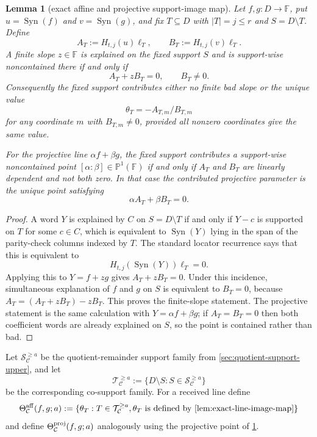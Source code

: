 \documentclass[11pt]{article}
\newtheorem{lemma}[theorem]{Lemma}
\theoremstyle{definition}
\theoremstyle{remark}
\newcommand{\F}{\mathbb{F}}
\newcommand{\Syn}{\operatorname{Syn}}
\begin{document}
\begin{lemma}[exact affine and projective support-image map]
\label{lem:exact-line-image-map}
Let $f,g:D\to\F$, put $u=\Syn(f)$ and $v=\Syn(g)$, and fix
$T\subseteq D$ with $|T|=j\le r$ and $S=D\setminus T$.  Define
\[
        A_T:=H_{t,j}(u)\boldsymbol\ell_T,
        \qquad
        B_T:=H_{t,j}(v)\boldsymbol\ell_T .
\]
A finite slope $z\in\F$ is explained on the fixed support $S$ and is
support-wise noncontained there if and only if
\[
        A_T+zB_T=0,
        \qquad B_T\ne0 .
\]
Consequently the fixed support contributes either no finite bad slope or the
unique value
\[
        \theta_T=-A_{T,m}/B_{T,m}
\]
for any coordinate $m$ with $B_{T,m}\ne0$, provided all nonzero coordinates give
the same value.

For the projective line $\alpha f+\beta g$, the fixed support contributes a
support-wise noncontained point $[\alpha:\beta]\in\mathbb P^1(\F)$ if and only if
$A_T$ and $B_T$ are linearly dependent and not both zero.  In that case the
contributed projective parameter is the unique point satisfying
\[
        \alpha A_T+\beta B_T=0 .
\]
\end{lemma}

\begin{proof}
A word $Y$ is explained by $C$ on $S=D\setminus T$ if and only if
$Y-c$ is supported on $T$ for some $c\in C$, which is equivalent to
$\Syn(Y)$ lying in the span of the parity-check columns indexed by $T$.  The
standard locator recurrence says that this is equivalent to
\[
        H_{t,j}(\Syn(Y))\boldsymbol\ell_T=0 .
\]
Applying this to $Y=f+zg$ gives $A_T+zB_T=0$.  Under this incidence, simultaneous
explanation of $f$ and $g$ on $S$ is equivalent to $B_T=0$, because
$A_T=(A_T+zB_T)-zB_T$.  This proves the finite-slope statement.  The projective
statement is the same calculation with $Y=\alpha f+\beta g$; if
$A_T=B_T=0$ then both coefficient words are already explained on $S$, so the
point is contained rather than bad.
\end{proof}

Let $\mathcal S_{\mathcal C}^{\ge a}$ be the quotient-remainder support family
from \cref{sec:quotient-support-upper}, and let
\[
        \mathcal T_{\mathcal C}^{\ge a}
        :=\{D\setminus S:S\in\mathcal S_{\mathcal C}^{\ge a}\}
\]
be the corresponding co-support family.  For a received line define
\[
        \Theta_{\mathcal C}^{\rm aff}(f,g;a)
        :=\{\theta_T:T\in\mathcal T_{\mathcal C}^{\ge a},
              \theta_T\text{ is defined by }\cref{lem:exact-line-image-map}\}
\]
and define $\Theta_{\mathcal C}^{\rm proj}(f,g;a)$ analogously using the
projective point of \cref{lem:exact-line-image-map}.
\end{document}
